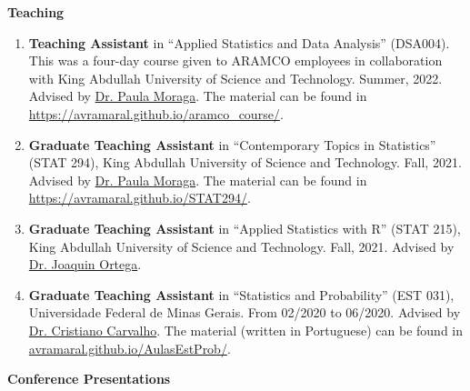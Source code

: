 \documentclass[11pt, ]{article}
\begin{document}
\vspace{6pt}

{\Large \textbf{Teaching}}

	\begin{enumerate}
		\item \textbf{Teaching Assistant} in ``Applied Statistics and Data Analysis'' (DSA004). This was a four-day course given to ARAMCO employees in collaboration with King Abdullah University of Science and Technology. Summer, 2022. Advised by \href{https://www.paulamoraga.com/}{Dr. Paula Moraga}. The material can be found in \href{https://avramaral.github.io/aramco\_course/}{https://avramaral.github.io/aramco\_course/}.
		
		\item \textbf{Graduate Teaching Assistant} in ``Contemporary Topics in Statistics'' (STAT 294), King Abdullah University of Science and Technology. Fall, 2021. Advised by \href{https://www.paulamoraga.com/}{Dr. Paula Moraga}. The material can be found in \href{https://avramaral.github.io/STAT294/}{https://avramaral.github.io/STAT294/}.
		
		\item \textbf{Graduate Teaching Assistant} in ``Applied Statistics with R'' (STAT 215), King Abdullah University of Science and Technology. Fall, 2021. Advised by \href{https://cemse.kaust.edu.sa/people/person/joaquin-ortega-sanchez}{Dr. Joaquin Ortega}.
		
		\item \textbf{Graduate Teaching Assistant} in ``Statistics and Probability'' (EST 031), Universidade Federal de Minas Gerais. From 02/2020 to 06/2020. Advised by \href{http://www.est.ufmg.br/~cristianocs/}{Dr. Cristiano Carvalho}. The material (written in Portuguese) can be found in \href{https://avramaral.github.io/AulasEstProb/}{avramaral.github.io/AulasEstProb/}.
	\end{enumerate}

\vspace{6pt}

{\Large \textbf{Conference Presentations}}
\end{document}

